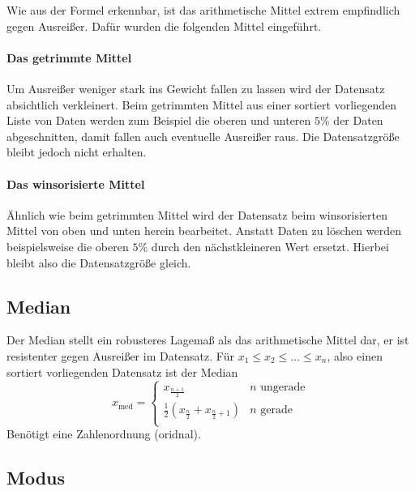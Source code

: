 Wie aus der Formel erkennbar, ist das arithmetische Mittel extrem empfindlich gegen Ausreißer. Dafür wurden die folgenden Mittel eingeführt.

\paragraph{Das getrimmte Mittel}
Um Ausreißer weniger stark ins Gewicht fallen zu lassen wird der Datensatz absichtlich verkleinert. Beim getrimmten Mittel aus einer sortiert vorliegenden Liste von Daten werden zum Beispiel die oberen und unteren $5\%$ der Daten abgeschnitten, damit fallen auch eventuelle Ausreißer raus. Die Datensatzgröße bleibt jedoch nicht erhalten.

\paragraph{Das winsorisierte Mittel}
Ähnlich wie beim getrimmten Mittel wird der Datensatz beim winsorisierten Mittel von oben und unten herein bearbeitet. Anstatt Daten zu löschen werden beispielsweise die oberen $5\%$ durch den nächstkleineren Wert ersetzt. Hierbei bleibt also die Datensatzgröße gleich.

\subsection{Median}
Der Median stellt ein robusteres Lagemaß als das arithmetische Mittel dar, er ist resistenter gegen Ausreißer im Datensatz.
Für $x_1\leq x_2\leq\ldots\leq x_n$, also einen sortiert vorliegenden Datensatz ist der Median
\begin{equation*}
	x_{\operatorname{med}}=
	\begin{cases}
		x_{\frac{n+1}2}& \text{$n$ ungerade}\\
		\frac 12 (x_{\frac n2}+x_{\frac n2 +1})& \text{$n$ gerade}\\
	\end{cases}
\end{equation*}
Benötigt eine Zahlenordnung (oridnal).

\subsection{Modus}

